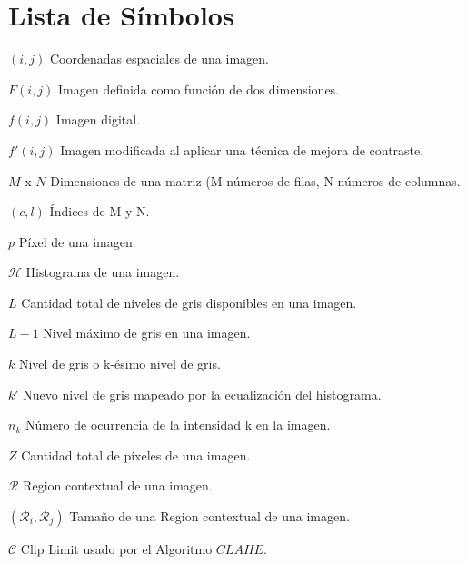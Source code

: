 \chapter*{Lista de Símbolos\hfill}

\begin{abbreviations}
    \item[$(i,j)$] Coordenadas espaciales de una imagen.
    \item[$F(i,j)$] Imagen definida como función de dos dimensiones.
    \item[$f(i,j)$] Imagen digital.
    \item[$f'(i,j)$] Imagen modificada al aplicar una técnica de mejora de contraste.
    \item[$M$ x $N$] Dimensiones de una matriz (M números de filas, N números de columnas.
    \item[$(c,l)$] Índices de M y N.
    \item[$p$] Píxel de una imagen.
    \item[$\mathcal{H}$] Histograma de una imagen.
    \item[$L$] Cantidad total de niveles de gris disponibles en una imagen.
    \item[$L-1$] Nivel máximo de gris en una imagen.
    \item[$k$] Nivel de gris o k-ésimo nivel de gris.
    \item[$k'$] Nuevo nivel de gris mapeado por la ecualización del histograma.
    \item[$n_k$] Número de ocurrencia de la intensidad k en la imagen.
    \item[$Z$] Cantidad total de píxeles de una imagen.
    \item[$\mathcal{R}$] Region contextual de una imagen.
    \item[$(\mathcal{R}_i,\mathcal{R}_j)$] Tamaño de una Region contextual de una imagen.
    \item[$\mathscr{C}$] Clip Limit usado por el Algoritmo $CLAHE$.
    

\end{abbreviations}
